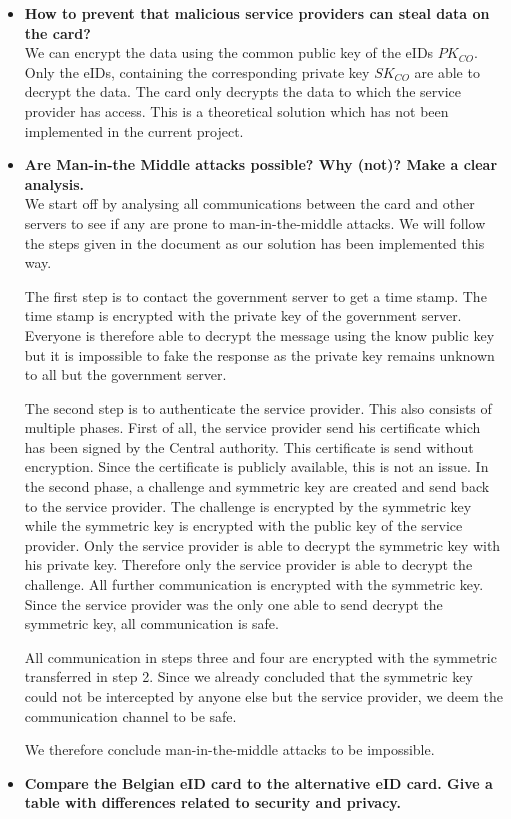 \documentclass[12pt]{report}
\begin{document}
\begin{itemize}
\item \textbf{How to prevent that malicious service providers can steal data on the card?}\\
We can encrypt the data using the common public key of the eIDs $PK_{CO}$. Only the eIDs, containing the corresponding private key $SK_{CO}$ are able to decrypt the data. The card only decrypts the data to which the service provider has access. This is a theoretical solution which has not been implemented in the current project.

\item \textbf{Are Man-in-the Middle attacks possible? Why (not)? Make a clear analysis.}\\
We start off by analysing all communications between the card and other servers to see if any are prone to man-in-the-middle attacks. We will follow the steps given in the document as our solution has been implemented this way.

The first step is to contact the government server to get a time stamp. The time stamp is encrypted with the private key of the government server. Everyone is therefore able to decrypt the message using the know public key but it is impossible to fake the response as the private key remains unknown to all but the government server.

The second step is to authenticate the service provider. This also consists of multiple phases. First of all, the service provider send his certificate which has been signed by the Central authority. This certificate is send without encryption. Since the certificate is publicly available, this is not an issue.
In the second phase, a challenge and symmetric key are created and send back to the service provider. The challenge is encrypted by the symmetric key while the symmetric key is encrypted with the public key of the service provider. Only the service provider is able to decrypt the symmetric key with his private key. Therefore only the service provider is able to decrypt the challenge. All further communication is encrypted with the symmetric key. Since the service provider was the only one able to send decrypt the symmetric key, all communication is safe.

All communication in steps three and four are encrypted with the symmetric transferred in step 2. Since we already concluded that the symmetric key could not be intercepted by anyone else but the service provider, we deem the communication channel to be safe.

We therefore conclude man-in-the-middle attacks to be impossible.

\item \textbf{Compare the Belgian eID card to the alternative eID card. Give a table with differences related to security and privacy.}\\

\end{itemize}
\end{document}
